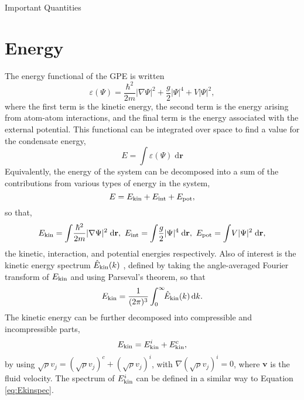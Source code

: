 \begin{chapter}{Important Quantities\label{app:ImpQuantities}}
\section{\label{appsection:energy} Energy}
The energy functional of the GPE is written
\begin{equation}
\varepsilon(\Psi) = \frac{\hbar^2}{2m}|\nabla\Psi|^2 + \frac{g}{2}|\Psi|^4 + V|\Psi|^2,
\label{eq:Efn}
\end{equation}
where the first term is the kinetic energy, the second term is the energy arising from atom-atom interactions, and the final term is the energy associated with the external potential. This functional can be integrated over space to find a value for the condensate energy,
\begin{equation}
E = \int\!\varepsilon(\Psi)\;\mathrm{d}\mathbf{r}
\label{eq:Efn}
\end{equation}
Equivalently, the energy of the system can be decomposed into a sum of the contributions from various types of energy in the system,
\begin{equation*}
E = E_{\rm kin} + E_{\rm int} + E_{\mathrm{pot}},
\label{eq:Esplit}
\end{equation*}
so that,
\begin{equation}
E_{\rm kin} = \int\!\frac{\hbar^2}{2m}|\nabla\Psi|^2\;\mathrm{d}\mathbf{r},~E_{\rm int}=\int\!\frac{g}{2}|\Psi|^4\;\mathrm{d}\mathbf{r},~E_{\mathrm{pot}}=\int\!V|\Psi|^2\;\mathrm{d}\mathbf{r},
\label{eq:Esplitdef}
\end{equation}
the kinetic, interaction, and potential energies respectively. Also of interest is the kinetic energy spectrum $\hat{E}_{\rm kin}(k)$ \cite{Nore}, defined by taking the angle-averaged Fourier transform of $E_{\rm kin}$ and using Parseval's theorem, so that
\begin{equation}
E_{\rm kin} = \frac{1}{(2\pi)^3}\int^\infty_0\!\!\hat{E}_{\rm kin}(k)\,\mathrm{d}k.
\label{eq:Ekinspec}
\end{equation}
The kinetic energy can be further decomposed into compressible and incompressible parts,
\begin{equation*}
E_{\rm kin} = E^i_{\rm kin} + E^c_{\rm kin},
\label{eq:Esplitdef}
\end{equation*}
by using $\sqrt{\rho}v_j = (\sqrt{\rho}v_j)^c + (\sqrt{\rho}v_j)^i$, with $\nabla(\sqrt{\rho}v_j)^i=0$, where $\mathbf{v}$ is the fluid velocity. The spectrum of $E^i_{\rm kin}$ can be defined in a similar way to Equation \ref{eq:Ekinspec}.



\end{chapter}
